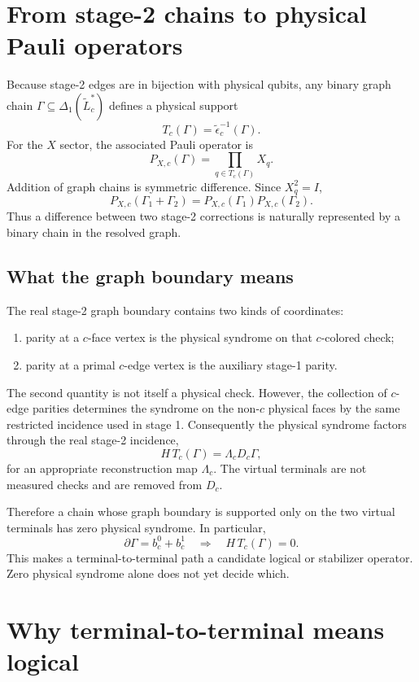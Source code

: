 \documentclass[11pt]{article}
\begin{document}
\section{From stage-2 chains to physical Pauli operators}

Because stage-2 edges are in bijection with physical qubits, any binary graph
chain $\Gamma\subseteq\Delta_1(\widetilde L_c^*)$ defines a physical support
\[
  T_c(\Gamma)=\widetilde\epsilon_c^{-1}(\Gamma).
\]
For the $X$ sector, the associated Pauli operator is
\[
  P_{X,c}(\Gamma)=\prod_{q\in T_c(\Gamma)}X_q.
\]
Addition of graph chains is symmetric difference. Since $X_q^2=I$,
\[
  P_{X,c}(\Gamma_1+\Gamma_2)
  =P_{X,c}(\Gamma_1)P_{X,c}(\Gamma_2).
\]
Thus a difference between two stage-2 corrections is naturally represented
by a binary chain in the resolved graph.

\subsection{What the graph boundary means}

The real stage-2 graph boundary contains two kinds of coordinates:
\begin{enumerate}
  \item parity at a $c$-face vertex is the physical syndrome on that
        $c$-colored check;
  \item parity at a primal $c$-edge vertex is the auxiliary stage-1 parity.
\end{enumerate}
The second quantity is not itself a physical check. However, the collection
of $c$-edge parities determines the syndrome on the non-$c$ physical faces by
the same restricted incidence used in stage 1. Consequently the physical
syndrome factors through the real stage-2 incidence,
\[
  H\,T_c(\Gamma)=\Lambda_c D_c\Gamma,
\]
for an appropriate reconstruction map $\Lambda_c$. The virtual terminals are
not measured checks and are removed from $D_c$.

Therefore a chain whose graph boundary is supported only on the two virtual
terminals has zero physical syndrome. In particular,
\[
  \partial\Gamma=b_c^0+b_c^1
  \quad\Longrightarrow\quad
  H\,T_c(\Gamma)=0.
\]
This makes a terminal-to-terminal path a candidate logical or stabilizer
operator. Zero physical syndrome alone does not yet decide which.

\section{Why terminal-to-terminal means logical}
\end{document}
